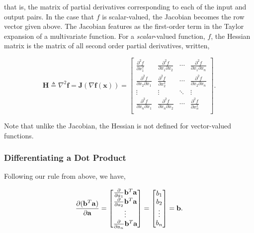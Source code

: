 \documentclass[11pt]{amsart}
\begin{document}
that is, the matrix of partial derivatives corresponding to each of the input and output pairs. In the case that $f$ is scalar-valued, the Jacobian becomes the row vector given above. The Jacobian features as the first-order term in the Taylor expansion of a multivariate function. For a \emph{scalar}-valued function, $f$, the Hessian matrix is the matrix of all second order partial derivatives, written,

$$\mathbf{H} \triangleq \nabla^2\mathbf{f} = \mathbf{J}(\nabla\mathbf{f}(\mathbf{x})) = \begin{bmatrix}
\frac{\partial^2 f}{\partial x_{1}^2}&\frac{\partial^2 f}{\partial x_{1}\partial x_{2}}&\cdots&\frac{\partial^2 f}{\partial x_{1}\partial x_{n}}\\
\frac{\partial^2 f}{\partial x_{2}\partial x_{1}}&\frac{\partial^2 f}{\partial x_{2}^2}&\cdots&\frac{\partial^2 f}{\partial x_{2}\partial x_{n}} \\
\vdots & \vdots & \ddots & \vdots \\
\frac{\partial^2 f}{\partial x_{n}\partial x_{1}}&\frac{\partial^2 f}{\partial x_{n}\partial x_{2}}&\cdots&\frac{\partial^2 f}{\partial x_{n}^2}\\
\end{bmatrix}.$$

Note that unlike the Jacobian, the Hessian is not defined for vector-valued functions.

\subsubsection{Differentiating a Dot Product}

Following our rule from above, we have,

\begin{align}
\frac{\partial(\mathbf{b}^T\mathbf{a})}{\partial\mathbf{a}} =
\begin{bmatrix}
\frac{\partial}{\partial a_1} \mathbf{b}^T\mathbf{a} \\
\frac{\partial}{\partial a_2} \mathbf{b}^T\mathbf{a} \\
\vdots \\
\frac{\partial}{\partial a_n} \mathbf{b}^T\mathbf{a} \\
\end{bmatrix}
= 
\begin{bmatrix}
b_1 \\
b_2 \\
\vdots \\
b_n \\
\end{bmatrix}
= \mathbf{b} \notag.
\end{align}
\end{document}
